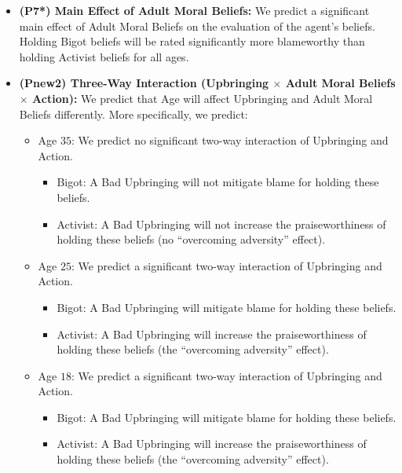 \documentclass[scrarticle]{scrartcl}
\begin{document}
\begin{itemize}
   \item[--] \textsf{\textbf{(P7*) Main Effect of Adult Moral Beliefs:}} We predict a significant main effect of Adult Moral Beliefs on the evaluation of the agent's beliefs. Holding Bigot beliefs will be rated significantly more blameworthy than holding Activist beliefs for all ages.
   \item[--] \textsf{\textbf{(Pnew2) Three-Way Interaction (Upbringing $\times$ Adult Moral Beliefs $\times$ Action):}} We predict that Age will affect Upbringing and Adult Moral Beliefs differently. More specifically, we predict:
   \begin{itemize}
      \item[--] Age $35$: We predict no significant two-way interaction of Upbringing and Action.
      \begin{itemize}
         \item[--] Bigot: A Bad Upbringing will not mitigate blame for holding these beliefs.
         \item[--] Activist: A Bad Upbringing will not increase the praiseworthiness of holding these beliefs (no \enquote{overcoming adversity} effect).
      \end{itemize}
      \item[--] Age $25$: We predict a significant two-way interaction of Upbringing and Action.
      \begin{itemize}
         \item[--] Bigot: A Bad Upbringing will mitigate blame for holding these beliefs.
         \item[--] Activist: A Bad Upbringing will increase the praiseworthiness of holding these beliefs (the \enquote{overcoming adversity} effect).
      \end{itemize}
      \item[--] Age $18$: We predict a significant two-way interaction of Upbringing and Action.
      \begin{itemize}
         \item[--] Bigot: A Bad Upbringing will mitigate blame for holding these beliefs.
         \item[--] Activist: A Bad Upbringing will increase the praiseworthiness of holding these beliefs (the \enquote{overcoming adversity} effect).
      \end{itemize}
   \end{itemize}
\end{itemize}
\end{document}
